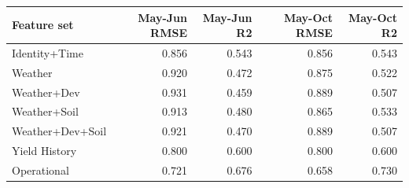 \begin{tabular}{lrrrr}
\toprule
Feature set & May-Jun RMSE & May-Jun R2 & May-Oct RMSE & May-Oct R2 \\
\midrule
Identity+Time & 0.856 & 0.543 & 0.856 & 0.543 \\
Weather & 0.920 & 0.472 & 0.875 & 0.522 \\
Weather+Dev & 0.931 & 0.459 & 0.889 & 0.507 \\
Weather+Soil & 0.913 & 0.480 & 0.865 & 0.533 \\
Weather+Dev+Soil & 0.921 & 0.470 & 0.889 & 0.507 \\
Yield History & 0.800 & 0.600 & 0.800 & 0.600 \\
Operational & 0.721 & 0.676 & 0.658 & 0.730 \\
\bottomrule
\end{tabular}

